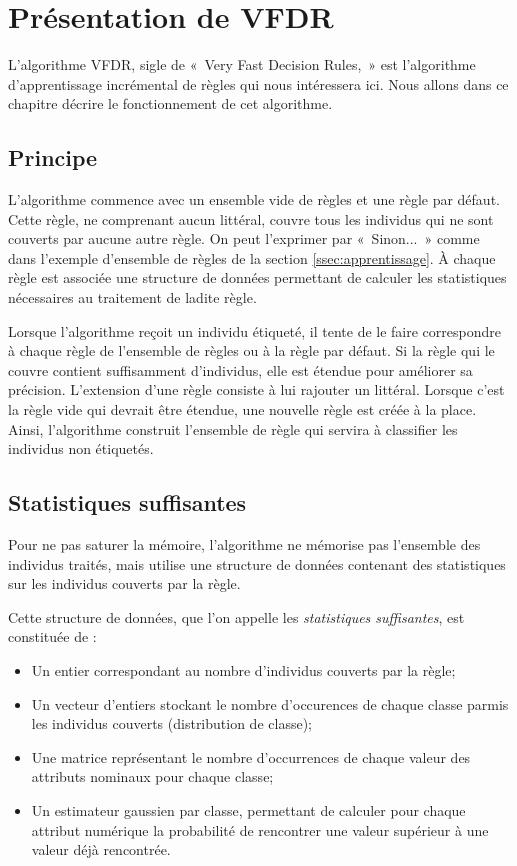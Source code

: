 \section{Présentation de VFDR}

        L’algorithme VFDR, sigle de «~Very Fast Decision Rules,~» est l’algorithme d’apprentissage incrémental de règles qui nous intéressera ici. Nous allons dans ce chapitre décrire le fonctionnement de cet algorithme.

        \subsection{Principe}

            L’algorithme commence avec un ensemble vide de règles et une règle par défaut. Cette règle, ne comprenant aucun littéral, couvre tous les individus qui ne sont couverts par aucune autre règle. On peut l'exprimer par «~Sinon...~» comme dans l'exemple d’ensemble de règles de la section \ref{ssec:apprentissage}. À chaque règle est associée une structure de données permettant de calculer les statistiques nécessaires au traitement de ladite règle.

            Lorsque l’algorithme reçoit un individu étiqueté, il tente de le faire correspondre à chaque règle de l’ensemble de règles ou à la règle par défaut. Si la règle qui le couvre contient suffisamment d’individus, elle est étendue pour améliorer sa précision. L’extension d’une règle consiste à lui rajouter un littéral. Lorsque c’est la règle vide qui devrait être étendue, une nouvelle règle est créée à la place. Ainsi, l’algorithme construit l’ensemble de règle qui servira à classifier les individus non étiquetés.

        \subsection{Statistiques suffisantes}\label{ssec:stats}

            Pour ne pas saturer la mémoire, l’algorithme ne mémorise pas l’ensemble des individus traités, mais utilise une structure de données contenant des statistiques sur les individus couverts par la règle.

            Cette structure de données, que l’on appelle les \emph{statistiques suffisantes}, est constituée de :
            \begin{itemize}
                \item Un entier correspondant au nombre d’individus couverts par la règle;
                \item Un vecteur d’entiers stockant le nombre d’occurences de chaque classe parmis les individus couverts (distribution de classe);
                \item Une matrice représentant le nombre d'occurrences de chaque valeur des attributs nominaux pour chaque classe;
                \item Un estimateur gaussien par classe, permettant de calculer pour chaque attribut numérique la probabilité de rencontrer une valeur supérieur à une valeur déjà rencontrée.
            \end{itemize}


